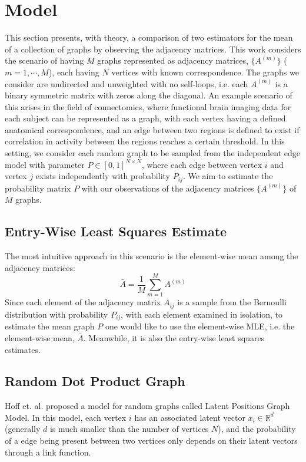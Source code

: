 \section{Model}
This section presents, with theory, a comparison of two estimators for the mean of a collection of graphs by observing the adjacency matrices.  This work considers the scenario of having $M$ graphs represented as adjacency matrices, $\{A^{(m)}\}$ ($m = 1, \cdots, M$), each having $N$ vertices with known correspondence.  The graphs we consider are undirected and unweighted with no self-loops, i.e. each $A^{(m)}$ is a binary symmetric matrix with zeros along the diagonal. An example scenario of this arises in the field of connectomics, where functional brain imaging data for each subject can be represented as a graph, with each vertex having a defined anatomical correspondence, and an edge between two regions is defined to exist if correlation in activity between the regions reaches a certain threshold. In this setting, we consider each random graph to be sampled from the independent edge model with parameter $P \in [0,1]^{N\times N}$, where each edge between vertex $i$ and vertex $j$ exists independently with probability $P_{ij}$. We aim to estimate the probability matrix $P$ with our observations of the adjacency matrices $\{A^{(m)}\}$ of $M$ graphs.



\subsection{Entry-Wise Least Squares Estimate}
The most intuitive approach in this scenario is the element-wise mean among the adjacency matrices:
\begin{equation}
\bar{A} = \frac{1}{M}\sum\limits_{m = 1}^M A^{(m)}
\end{equation}
Since each element of the adjacency matrix $A_{ij}$ is a sample from the Bernoulli distribution with probability $P_{ij}$, with each element examined in isolation, to estimate the mean graph $P$ one would like to use the element-wise MLE, i.e. the element-wise mean, $\bar{A}$. Meanwhile, it is also the entry-wise least squares estimates.



\subsection{Random Dot Product Graph}
Hoff et. al. proposed a model for random graphs called Latent Positions Graph Model. In this model, each vertex $i$ has an associated latent vector $x_i \in \mathbb{R}^d$ (generally $d$ is much smaller than the number of vertices $N$), and the probability of a edge being present between two vertices only depends on their latent vectors through a link function. \cite{Hoff}

